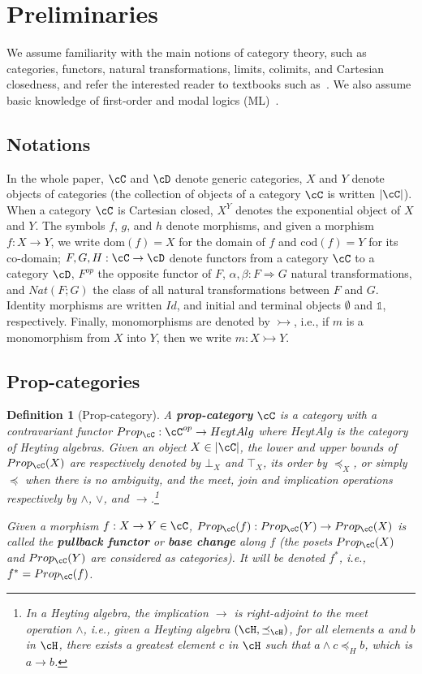 \documentclass[preprint,3p,times]{elsarticle}
\newtheorem{definition}{Definition}[section]
\newcommand{\dom}{\mathrm{dom}}
\newcommand{\codom}{\mathrm{cod}}
\newcommand{\Heytalg}{HeytAlg}
\newcommand{\mto}{\rightarrowtail}
\begin{document}
\section{Preliminaries}

We assume familiarity with the main notions of category theory, such as categories, functors, natural transformations, limits, colimits, and Cartesian closedness, and refer the interested reader to textbooks such as~\cite{BW90,McL71}. We also assume basic knowledge of first-order and modal logics (ML)~\cite{CK73,Che80}.

\subsection{Notations}

In the whole paper, $\cC$ and $\cD$ denote generic categories, $X$ and $Y$ denote objects of categories (the collection of objects of a category $\cC$ is written $|\cC|$). When a category $\cC$ is Cartesian closed, $X^Y$ denotes the exponential object of $X$ and $Y$. The symbols $f$, $g$, and $h$ denote morphisms, and given a morphism $f : X \to Y$, we write $\dom(f) = X$ for the domain of $f$ and $\codom(f) = Y$ for its co-domain; $F,G,H : \cC \to \cD$ denote functors from a category $\cC$ to a category $\cD$, $F^{op}$ the opposite functor of $F$, $\alpha,\beta : F \Rightarrow G$ natural transformations, and $Nat(F;G)$ the class of all natural transformations between $F$ and $G$. Identity morphisms are written $Id$, and initial and terminal objects $\emptyset$ and $\mathbb{1}$, respectively. Finally, monomorphisms are denoted by $\mto$, i.e., if $m$ is a monomorphism from $X$ into $Y$, then we write $m: X \mto Y$.

\subsection{Prop-categories}
\begin{definition}[Prop-category]
\label{def:prop-category}
A {\bf prop-category} $\cC$ is a category %
with a contravariant functor $Prop_\cC : \cC^{op} \to \Heytalg$ where $\Heytalg$ is the category of Heyting algebras.
Given an object $X \in |\cC|$, the lower and upper bounds of $Prop_\cC(X)$ are respectively denoted by $\bot_X$ and $\top_X$, its order by $\preceq_X$, or simply $\preceq$ when there is no ambiguity, 
and the meet, join and implication operations respectively by $\wedge$, $\vee$, and $\rightarrow$.\footnote{In a Heyting algebra, the implication $\to$ is right-adjoint to the meet operation $\wedge$, i.e., given a Heyting algebra \((\cH,\preceq_\cH)\), for all elements \(a\) and \(b\) in \(\cH\), there exists a greatest element \(c\) in \(\cH\) such that \(a \wedge c \preceq_H b\), which is \(a \rightarrow b\).
}

Given a morphism $f : X \to Y \in \cC$, $Prop_\cC(f) : Prop_\cC(Y) \to Prop_\cC(X)$ is called the {\bf pullback functor} or {\bf base change} along $f$ (the posets $Prop_\cC(X)$ and $Prop_\cC(Y)$ are considered as categories). It will be denoted $f^*$, i.e., $f^* = Prop_\cC(f)$. 
\end{definition}
\end{document}
